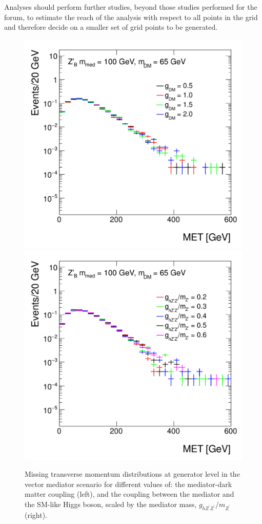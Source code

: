 Analyses should perform further studies, beyond those studies performed for the forum, to estimate the reach of the analysis with respect to all points in the grid and therefore decide on a smaller set of grid points to be generated.

\begin{figure}[hbpt!]
	\includegraphics[width=0.49\linewidth]{figures/EW/monoH/z_gdm_MET_et_Log}
	\includegraphics[width=0.49\linewidth]{figures/EW/monoH/z_ratio_MET_et_Log}
	\caption{Missing transverse momentum distributions at generator level in the vector 
		mediator scenario for different values of: the mediator-dark matter coupling \gdm (left),
		and the coupling between the mediator and the SM-like Higgs boson, scaled by the mediator mass, 
		$g_{h Z^\prime Z^\prime}/m_{Z^\prime}$ (right).
		\label{fig:metVectorCoupling}}
\end{figure}

